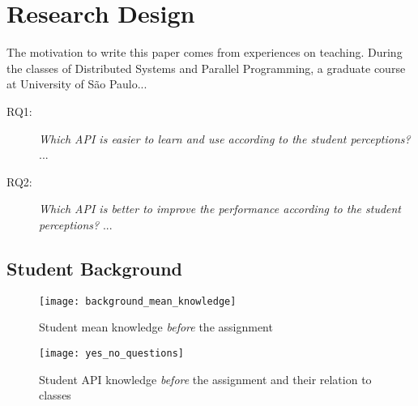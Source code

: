 \section{Research Design}
\label{sec:researchdesing}

The motivation to write this paper comes from experiences on teaching. During the classes of Distributed Systems and Parallel Programming, a graduate course at University of São Paulo...

\begin{description}
\item[RQ1:] \textit{Which API is easier to learn and use according to the student perceptions?}
%
...
\item[RQ2:] \textit{Which API is better to improve the performance according to the student perceptions?}
%
...

\end{description}

\subsection{Student Background}

\begin{figure}[htpb]
    \centering
    \texttt{[image: background\_mean\_knowledge]}
    \caption{Student mean knowledge \textit{before} the assignment}
    \label{fig:student-mean-knowledge}
\end{figure}

\begin{figure}[htpb]
    \centering
    \texttt{[image: yes\_no\_questions]}
    \caption{Student API knowledge \textit{before} the assignment and their relation to classes}
    \label{fig:student-knowledge-yes-no}
\end{figure}



